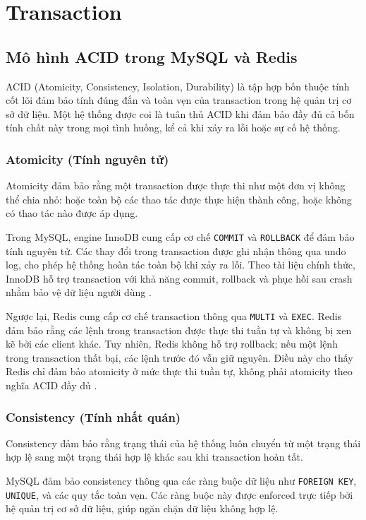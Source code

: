 \section{Transaction}
\subsection{Mô hình ACID trong MySQL và Redis}

ACID (Atomicity, Consistency, Isolation, Durability) là tập hợp bốn thuộc tính cốt lõi đảm bảo tính đúng đắn và toàn vẹn của transaction trong hệ quản trị cơ sở dữ liệu. Một hệ thống được coi là tuân thủ ACID khi đảm bảo đầy đủ cả bốn tính chất này trong mọi tình huống, kể cả khi xảy ra lỗi hoặc sự cố hệ thống.

\subsubsection{Atomicity (Tính nguyên tử)}

Atomicity đảm bảo rằng một transaction được thực thi như một đơn vị không thể chia nhỏ: hoặc toàn bộ các thao tác được thực hiện thành công, hoặc không có thao tác nào được áp dụng.

Trong MySQL, engine InnoDB cung cấp cơ chế \texttt{COMMIT} và \texttt{ROLLBACK} để đảm bảo tính nguyên tử. Các thay đổi trong transaction được ghi nhận thông qua undo log, cho phép hệ thống hoàn tác toàn bộ khi xảy ra lỗi. Theo tài liệu chính thức, InnoDB hỗ trợ transaction với khả năng commit, rollback và phục hồi sau crash nhằm bảo vệ dữ liệu người dùng .

Ngược lại, Redis cung cấp cơ chế transaction thông qua \texttt{MULTI} và \texttt{EXEC}. Redis đảm bảo rằng các lệnh trong transaction được thực thi tuần tự và không bị xen kẽ bởi các client khác. Tuy nhiên, Redis không hỗ trợ rollback; nếu một lệnh trong transaction thất bại, các lệnh trước đó vẫn giữ nguyên. Điều này cho thấy Redis chỉ đảm bảo atomicity ở mức thực thi tuần tự, không phải atomicity theo nghĩa ACID đầy đủ .

\subsubsection{Consistency (Tính nhất quán)}

Consistency đảm bảo rằng trạng thái của hệ thống luôn chuyển từ một trạng thái hợp lệ sang một trạng thái hợp lệ khác sau khi transaction hoàn tất.

MySQL đảm bảo consistency thông qua các ràng buộc dữ liệu như \texttt{FOREIGN KEY}, \texttt{UNIQUE}, và các quy tắc toàn vẹn. Các ràng buộc này được enforced trực tiếp bởi hệ quản trị cơ sở dữ liệu, giúp ngăn chặn dữ liệu không hợp lệ.

